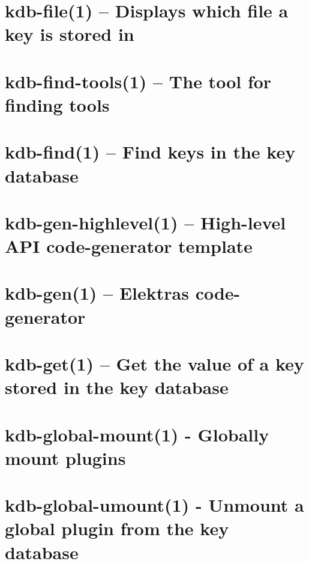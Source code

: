 \let\mypdfximage\pdfximage\def\pdfximage{\immediate\mypdfximage}\documentclass[twoside]{book}
\newcommand{\+}{\discretionary{\mbox{\scriptsize$\hookleftarrow$}}{}{}}
\begin{document}
\chapter{kdb-\/file(1) -- Displays which file a key is stored in}
\label{doc_help_kdb-file_md}

\chapter{kdb-\/find-\/tools(1) -- The tool for finding tools}
\label{doc_help_kdb-find-tools_md}

\chapter{kdb-\/find(1) -- Find keys in the key database}
\label{doc_help_kdb-find_md}

\chapter{kdb-\/gen-\/highlevel(1) -- High-\/level A\+PI code-\/generator template}
\label{doc_help_kdb-gen-highlevel_md}

\chapter{kdb-\/gen(1) -- Elektra\textquotesingle{}s code-\/generator}
\label{doc_help_kdb-gen_md}

\chapter{kdb-\/get(1) -- Get the value of a key stored in the key database}
\label{doc_help_kdb-get_md}

\chapter{kdb-\/global-\/mount(1) -\/ Globally mount plugins}
\label{doc_help_kdb-global-mount_md}

\chapter{kdb-\/global-\/umount(1) -\/ Unmount a global plugin from the key database}
\label{doc_help_kdb-global-umount_md}

\end{document}
